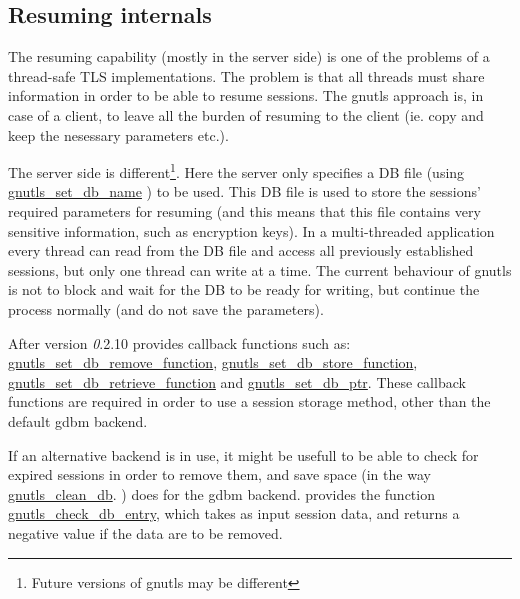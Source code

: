 \subsection{Resuming internals}
The resuming capability (mostly in the server side) is one of the problems of a thread-safe TLS
implementations. The problem is that all threads must share information in
order to be able to resume sessions. The gnutls approach is, in case of a
client, to leave all the burden of resuming to the client (ie. copy and keep the
nesessary parameters etc.).
\par
The server side is different\footnote{Future versions of gnutls may be
different}. 
Here the server only specifies a DB file (using 
\hyperref{gnutls\_set\_db\_name()}{gnutls\_set\_db\_name() (see Section }{ for more
information)}{gnutls_set_db_name}
) to be used. This DB file is used to store the sessions' required parameters for
resuming (and this means that this file contains very sensitive information,
such as encryption keys). In a multi-threaded application every thread can
read from the DB file and access all previously established sessions, but
only one thread can write at a time. The current behaviour of gnutls is
not to block and wait for the DB to be ready for writing, but continue the
process normally (and do not save the parameters).  
\par
 After version {\emph 0.2.10} \gnutls provides callback functions such as:
\hyperref{gnutls\_set\_db\_remove\_function()}{gnutls\_set\_db\_remove\_function() (see Section }{ for more
information)}{gnutls_set_db_remove_function},
\hyperref{gnutls\_set\_db\_store\_function()}{gnutls\_set\_db\_store\_function() (see Section }{ for more
information)}{gnutls_set_db_store_function},
\hyperref{gnutls\_set\_db\_retrieve\_function()}{gnutls\_set\_db\_retrieve\_function() (see Section }{ for more
information)}{gnutls_set_db_retrieve_function} and
\hyperref{gnutls\_set\_db\_ptr()}{gnutls\_set\_db\_ptr() (see Section }{ for more
information)}{gnutls_set_db_ptr}.
These callback functions are required in order to use a session
storage method, other than the default gdbm backend. 
\par
If an alternative backend is in use, it might be usefull to be able to check
for expired sessions in order to remove them, and save space (in the way 
\hyperref{gnutls\_clean\_db()}{gnutls\_clean\_db() (see Section }{ for more
information)}{gnutls_clean_db}.
) does for the gdbm backend. \gnutls provides the function
\hyperref{gnutls\_check\_db\_entry()}{gnutls\_check\_db\_entry() (see Section }{ for more
information)}{gnutls_check_db_entry}, which takes as input session data, and
returns a negative value if the data are to be removed.

